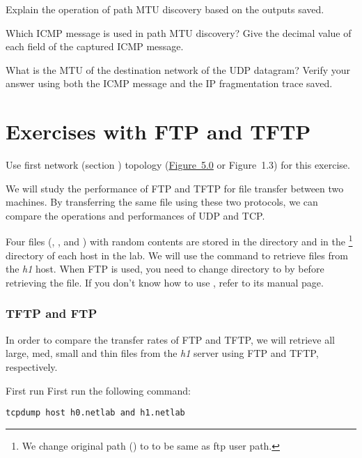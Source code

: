 \documentclass{../UTNetLab}
\begin{document}
\begin{report}
    \item Explain the operation of path MTU discovery based on the  outputs saved.

    \item Which ICMP message is used in path MTU discovery? Give the decimal value of each field of the captured ICMP message.

    \item What is the MTU of the destination network of the UDP datagram? Verify your answer using both the ICMP message and the IP fragmentation trace saved.
\end{report}

\part{Exercises with FTP and TFTP}
Use first network (section ) topology (\hyperref[fig:5.0]{Figure~5.0} or Figure~1.3) for this exercise.

We will study the performance of FTP and TFTP for file transfer between two machines.
By transferring the same file using these two protocols, we can compare the operations and performances of UDP and TCP.

Four files (, ,  and ) with random contents are stored in the  directory and in the \footnote{We change original path () to  to be same as ftp user path.} directory of each host in the lab.
We will use the  command to retrieve files from the \textit{h1} host.
When FTP is used, you need to change directory to  by  before retrieving the file.
If you don’t know how to use , refer to its manual page.


\section{TFTP and FTP}
In order to compare the transfer rates of FTP and TFTP, we will retrieve all large, med, small and thin files from the \textit{h1} server using FTP and TFTP, respectively.

First run First run the following  command:
\begin{lstlisting}[emph={h0,h1,netlab},morekeywords={[3]host,and}]
tcpdump host h0.netlab and h1.netlab
    \end{lstlisting}
\end{document}

